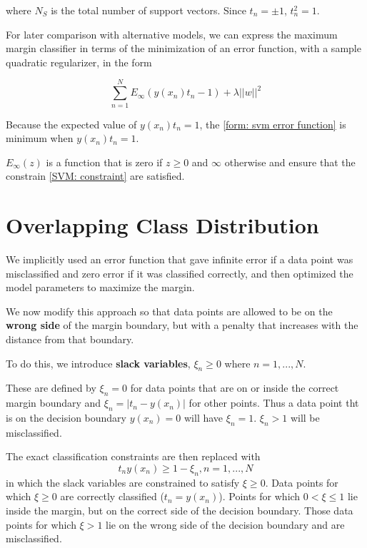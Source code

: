 where $N_S$ is the total number of support vectors.
Since $t_n=\pm 1$, $t_n^2=1$.

For later comparison with alternative models, we can express the maximum margin classifier in terms of the minimization of an error function, with a sample quadratic regularizer, in the form

\begin{equation}
    \label{form: svm error function}
    \sum_{n=1}^N E_\infty (y(x_n)t_n - 1) + \lambda ||w||^2
\end{equation}


Because the expected value of $y(x_n)t_n=1$, the \ref{form: svm error function} is minimum when $y(x_n)t_n=1$.

$E_\infty(z)$ is a function that is zero if $z \geq 0$ and $\infty$ otherwise and ensure that the constrain \ref{SVM: constraint} are satisfied.

 \section{Overlapping Class Distribution}
 
 We implicitly used an error function that gave infinite error if a data point was misclassified and zero error if it was classified correctly, and then optimized the model parameters to maximize the margin.
 
 We now modify this approach so that data points are allowed to be on the \textbf{wrong side} of the margin boundary, but with a penalty that increases with the distance from that boundary.
 
 To do this, we introduce \textbf{slack variables}, $\xi_n \geq 0$ where $n=1, ..., N$.
 
 These are defined by $\xi_n = 0$ for data points that are on or inside the correct margin boundary and $\xi_n = |t_n - y(x_n)|$ for other points. Thus a data point tht is on the decision boundary $y(x_n)=0$ will have $\xi_n=1$. $\xi_n > 1$ will be misclassified.
 
 The exact classification constraints are then replaced with
 \begin{equation}
    \label{SVM: slack variable constraint}
     t_ny(x_n) \geq 1 - \xi_n, n = 1,...,N
 \end{equation}
 in which the slack variables are constrained to satisfy $\xi \geq 0$. Data points for which $\xi \geq 0$ are correctly classified ($t_n = y(x_n)$). Points for which $0 < \xi \leq 1$ lie inside the margin, but on the correct side of the decision boundary. Those data points for which $\xi > 1$ lie on the wrong side of the decision boundary and are misclassified.
 
